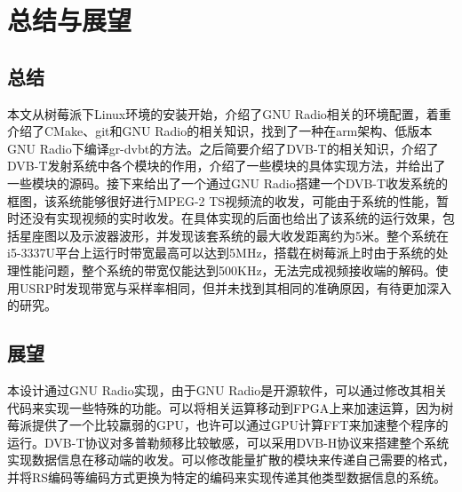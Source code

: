 \chapter{总结与展望}
	\section{总结}
	\par 本文从树莓派下Linux环境的安装开始，介绍了GNU Radio相关的环境配置，着重介绍了CMake、git和GNU Radio的相关知识，找到了一种在arm架构、低版本GNU Radio下编译gr-dvbt的方法。之后简要介绍了DVB-T的相关知识，介绍了DVB-T发射系统中各个模块的作用，介绍了一些模块的具体实现方法，并给出了一些模块的源码。接下来给出了一个通过GNU Radio搭建一个DVB-T收发系统的框图，该系统能够很好进行MPEG-2 TS视频流的收发，可能由于系统的性能，暂时还没有实现视频的实时收发。在具体实现的后面也给出了该系统的运行效果，包括星座图以及示波器波形，并发现该套系统的最大收发距离约为5米。整个系统在i5-3337U平台上运行时带宽最高可以达到5MHz，搭载在树莓派上时由于系统的处理性能问题，整个系统的带宽仅能达到500KHz，无法完成视频接收端的解码。使用USRP时发现带宽与采样率相同，但并未找到其相同的准确原因，有待更加深入的研究。
	\section{展望}
	\par 本设计通过GNU Radio实现，由于GNU Radio是开源软件，可以通过修改其相关代码来实现一些特殊的功能。可以将相关运算移动到FPGA上来加速运算，因为树莓派提供了一个比较羸弱的GPU，也许可以通过GPU计算FFT来加速整个程序的运行。DVB-T协议对多普勒频移比较敏感，可以采用DVB-H协议来搭建整个系统实现数据信息在移动端的收发。可以修改能量扩散的模块来传递自己需要的格式，并将RS编码等编码方式更换为特定的编码来实现传递其他类型数据信息的系统。
